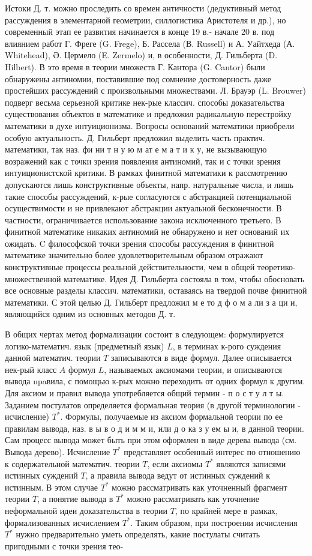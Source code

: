\documentclass[10pt]{article}
\begin{document}
Истоки Д. т. можно проследить со времен античности (дедуктивный метод рассуждения в элементарной геометрии, силлогистика Аристотеля и др.), но современный этап ее развития начинается в конце 19 в.- начале 20 в. под влиянием работ Г. Фреге (G. Frege), Б. Рассела (В. Russell) и А. Уайтхеда (А. Whitehead), Ә. Цермело (E. Zermelo) и, в особенности, Д. Гильберта (D. Hilbert). В это время в теории множеств Г. Кантора (G. Cantor) были обнаружены антиномии, поставившие под сомнение достоверность даже простейших рассуждений с произвольными множествами. Л. Брауэр (L. Brouwer) подверг весьма серьезной критике нек-рые классич. способы доказательства существования объектов в математике и предложил радикальную перестройку математики в духе интуиционизма. Вопросы оснований математики приобрели особую актуальность. Д. Гильберт предложил выделить часть практич. математики, так наз. фи ни т н у ю м ат е м а т и к у, не вызывающую возражений как с точки зрения появления антиномий, так и с точки зрения интуиционистской критики. В рамках финитной математики к рассмотрению допускаются лишь конструктивные объекты, напр. натуральные числа, и лишь такие способы рассуждений, к-рые согласуются с абстракцией потенциальной осуществимости и не привлекают абстракции актуальной бесконечности. В частности, ограничивается использование закона исключенного третьего. В финитной математике никаких антиномий не обнаружено и нет оснований их ожидать. C философской точки зрения способы рассуждения в финитной математике значительно более удовлетворительным образом отражают конструктивные процессы реальной действительности, чем в общей теоретико-множественной математике. Идея Д. Гильберта состояла в том, чтобы обосновать все основные разделы классич. математики, оставаясь на твердой почве финитной математики. С этой целью Д. Гильберт предложил м е то д ф о м а ли з а ци и, являющийся одним из основных методов Д. т.



В общих чертах метод формализации состоит в следующем: формулируется логико-математич. язык (предметный язык) $L$, в терминах к-рого суждения данной математич. теории $T$ записываются в виде формул. Далее описывается нек-рый класс $A$ формул $L$, называемых аксиомами теории, и описываются вывода npaвила, с помощью к-рых можно переходить от одних формул к другим. Для аксиом и правил вывода употребляется общий термин - п о с т у л т ы. Заданием постулатов определяется формальная теория (в другой терминологии - исчисление) $T^{*}$. Формулы, получаемые из аксиом формальной теории по ее правилам вывода, наз. в ы в о д и м м и, или д о ка з у ем ы и, в данной теории. Сам процесс вывода может быть при этом оформлен в виде дерева вывода (см. Вывода дерево). Исчисление $T^{*}$ представляет особенный интерес по отношению к содержательной математич. теории $T$, если аксиомы $T^{*}$ являются записями истинных суждений $T$, а правила вывода ведут от истинных суждений к истинным. В этом случае $T^{*}$ можно рассматривать как уточненный фрагмент теории $T$, а понятие вывода в $T^{*}$ можно рассматривать как уточнение неформальной идеи доказательства в теории $T$, по крайней мере в рамках, формализованных исчислением $T^{*}$. Таким образом, при построении исчисления $T^{*}$ нужно предварительно уметь определять, какие постулаты считать пригодными с точки зрения тео-
\end{document}
